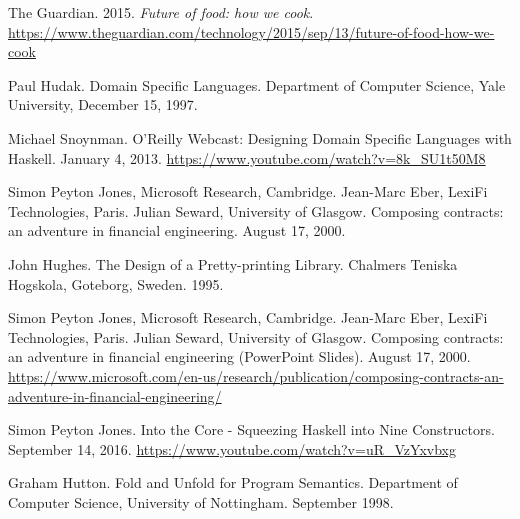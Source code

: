 \documentclass[11pt]{article}
\begin{document}
    \newpage
    \begin{thebibliography}{5}

        The Guardian. 2015. \textit{Future of food: how we cook}.
        \url{https://www.theguardian.com/technology/2015/sep/13/future-of-food-how-we-cook}

        Paul Hudak. Domain Specific Languages. Department of Computer
        Science, Yale University, December 15, 1997.

        Michael Snoynman. O'Reilly Webcast: Designing Domain Specific
        Languages with Haskell. January 4, 2013.
        \url{https://www.youtube.com/watch?v=8k_SU1t50M8}

        Simon Peyton Jones, Microsoft Research, Cambridge.
        Jean-Marc Eber, LexiFi Technologies, Paris. Julian Seward,
        University of Glasgow. Composing contracts: an adventure in
        financial engineering. August 17, 2000.

        John Hughes. The Design of a Pretty-printing Library.
        Chalmers Teniska Hogskola, Goteborg, Sweden. 1995.

        Simon Peyton Jones, Microsoft Research, Cambridge.
        Jean-Marc Eber, LexiFi Technologies, Paris. Julian Seward,
        University of Glasgow. Composing contracts: an adventure in
        financial engineering (PowerPoint Slides). August 17, 2000.
        \url{https://www.microsoft.com/en-us/research/publication/composing-contracts-an-adventure-in-financial-engineering/}

        Simon Peyton Jones. Into the Core - Squeezing Haskell into
        Nine Constructors. September 14, 2016.
        \url{https://www.youtube.com/watch?v=uR_VzYxvbxg}

        Graham Hutton. Fold and Unfold for Program Semantics. Department of
        Computer Science, University of Nottingham. September 1998.

    \end{thebibliography}   
     
\end{document}
